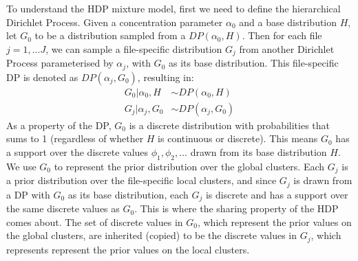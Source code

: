 To understand the HDP mixture model, first we need to define the hierarchical Dirichlet Process. Given a concentration parameter $\alpha_0$ and a base distribution $H$, let $G_0$ to be a distribution sampled from a $DP(\alpha_0, H)$. Then for each file $j=1,...J$, we can sample a file-specific distribution $G_j$ from another Dirichlet Process parameterised by $\alpha_j$, with $G_0$ as its base distribution. This file-specific DP is denoted as $DP(\alpha_j, G_0)$, resulting in:
\begin{equation}
\begin{aligned}
G_0 \vert \alpha_0, H &\sim DP(\alpha_0, H) \\
G_j \vert \alpha_j, G_0 &\sim DP(\alpha_j, G_0)
\end{aligned}
\label{eq:background-hdp-process}
\end{equation}
As a property of the DP, $G_0$ is a discrete distribution with probabilities that sums to 1 (regardless of whether $H$ is continuous or discrete). This means $G_0$ has a support over the discrete values ${\phi_1, \phi_2, ... }$ drawn from its base distribution $H$. We use $G_0$ to represent the prior distribution over the global clusters. Each $G_j$ is a prior distribution over the file-specific local clusters, and since $G_j$ is drawn from a DP with $G_0$ as its base distribution, each $G_j$ is discrete and has a support over the same discrete values as $G_0$. This is where the sharing property of the HDP comes about. The set of discrete values in $G_0$, which represent the prior values on the global clusters, are inherited (copied) to be the discrete values in $G_j$, which represents represent the prior values on the local clusters.

